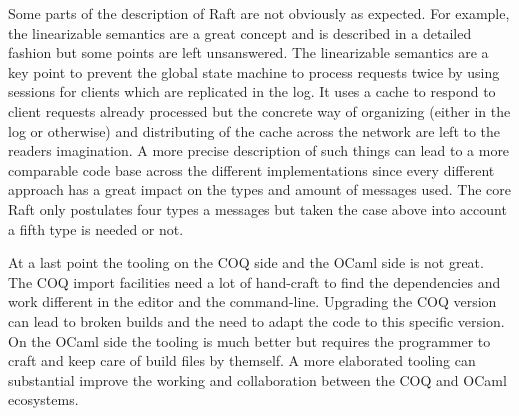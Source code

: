 Some parts of the description of Raft are not
obviously as expected. For example, the linearizable
semantics are a great concept and is described in a
detailed fashion but some points are left unsanswered.
The linearizable semantics are a key point to
prevent the global state machine to process requests
twice by using sessions for clients which are replicated
in the log. It uses a cache to respond to client requests
already processed but the concrete way of organizing
(either in the log or otherwise) and distributing of
the cache across the network are left to the readers
imagination. A more precise description of such things
can lead to a more comparable code base across the
different implementations since every different approach
has a great impact on the types and amount of messages
used. The core Raft only postulates four types
a messages but taken the case above into account a fifth
type is needed or not.

At a last point the tooling on the COQ side and the OCaml
side is not great. The COQ import facilities need a lot
of hand-craft to find the dependencies and work different
in the editor and the command-line. Upgrading the COQ
version can lead to broken builds and the need to adapt
the code to this specific version. On the OCaml side
the tooling is much better but requires the programmer
to craft and keep care of build files by themself.
A more elaborated tooling can substantial improve
the working and collaboration between the COQ and OCaml
ecosystems.

